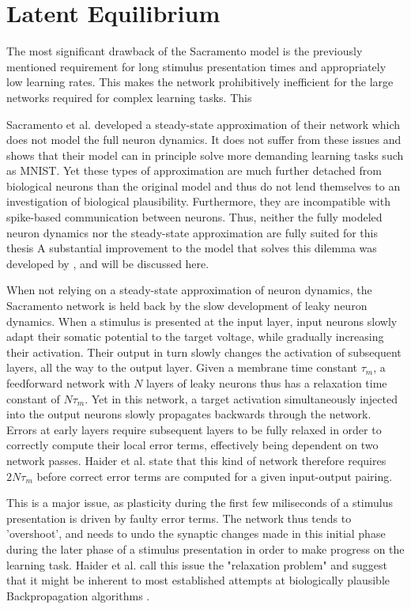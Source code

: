 \section{Latent Equilibrium}\label{sec-haider}

The most significant drawback of the Sacramento model is the previously mentioned requirement for long stimulus
presentation times and appropriately low learning rates. This makes the network prohibitively inefficient for the large
networks required for complex learning tasks. This

Sacramento et al. developed a steady-state approximation of their network which does not model the full neuron dynamics.
It does not suffer from these issues and shows that their model can in principle solve more demanding learning tasks
such as MNIST. Yet these types of approximation are much further detached from biological neurons than the original
model and thus do not lend themselves to an investigation of biological plausibility. Furthermore, they are incompatible
with spike-based communication between neurons. Thus, neither the fully modeled neuron dynamics nor the steady-state
approximation are fully suited for this thesis A substantial improvement to the model that solves this dilemma was
developed by \cite{Haider2021}, and will be discussed here.
\newline

When not relying on a steady-state approximation of neuron dynamics, the Sacramento network is held back by the slow
development of leaky neuron dynamics. When a stimulus is presented at the input layer, input neurons slowly adapt their
somatic potential to the target voltage, while gradually increasing their activation. Their output in turn slowly
changes the activation of subsequent layers, all the way to the output layer. Given a membrane time constant $\tau_m$, a
feedforward network with $N$ layers of leaky neurons thus has a relaxation time constant of $N \tau_m$. Yet in this
network, a target activation simultaneously injected into the output neurons slowly propagates backwards through the
network. Errors at early layers require subsequent layers to be fully relaxed in order to correctly compute their local
error terms, effectively being dependent on two network passes. Haider et al. state that this kind of network therefore
requires $2N\tau_m$ before correct error terms are computed for a given input-output pairing.

This is a major issue, as plasticity during the first few miliseconds of a stimulus presentation is driven by faulty
error terms. The network thus tends to 'overshoot', and needs to undo the synaptic changes made in this initial phase
during the later phase of a stimulus presentation in order to make progress on the learning task. Haider et al. call
this issue the "relaxation problem" and suggest that it might be inherent to most established attempts at biologically
plausible Backpropagation algorithms
\citep{Whittington2017,guerguiev2017towards,sacramento2018dendritic,millidge2020activation}.


